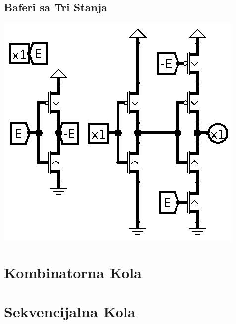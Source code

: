 \documentclass[12p,a4paper]{article}
\begin{document}
\begin{multicols}{2}
    \subsection{Baferi sa Tri Stanja}

    \includegraphics[width=0.7\columnwidth]{Figures/mos_tristate_buffer.png}
    
    \section{Kombinatorna Kola}

    \section{Sekvencijalna Kola}
    
    

\end{multicols}
\end{document}
